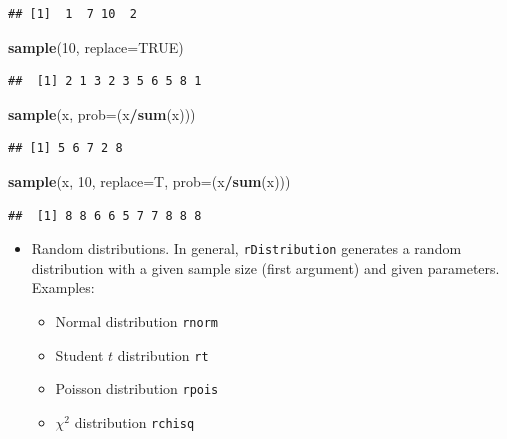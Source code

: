 \documentclass[
]{article}
\newenvironment{Shaded}{\begin{snugshade}}{\end{snugshade}}
\newcommand{\DataTypeTok}[1]{\textcolor[rgb]{0.13,0.29,0.53}{#1}}
\newcommand{\DecValTok}[1]{\textcolor[rgb]{0.00,0.00,0.81}{#1}}
\newcommand{\KeywordTok}[1]{\textcolor[rgb]{0.13,0.29,0.53}{\textbf{#1}}}
\newcommand{\NormalTok}[1]{#1}
\newcommand{\OperatorTok}[1]{\textcolor[rgb]{0.81,0.36,0.00}{\textbf{#1}}}
\newcommand{\OtherTok}[1]{\textcolor[rgb]{0.56,0.35,0.01}{#1}}
\providecommand{\tightlist}{%
  \setlength{\itemsep}{0pt}\setlength{\parskip}{0pt}}
\begin{document}
\begin{verbatim}
## [1]  1  7 10  2
\end{verbatim}

\begin{Shaded}
\begin{Highlighting}[]
\KeywordTok{sample}\NormalTok{(}\DecValTok{10}\NormalTok{, }\DataTypeTok{replace=}\OtherTok{TRUE}\NormalTok{)}
\end{Highlighting}
\end{Shaded}

\begin{verbatim}
##  [1] 2 1 3 2 3 5 6 5 8 1
\end{verbatim}

\begin{Shaded}
\begin{Highlighting}[]
\KeywordTok{sample}\NormalTok{(x, }\DataTypeTok{prob=}\NormalTok{(x}\OperatorTok{/}\KeywordTok{sum}\NormalTok{(x)))}
\end{Highlighting}
\end{Shaded}

\begin{verbatim}
## [1] 5 6 7 2 8
\end{verbatim}

\begin{Shaded}
\begin{Highlighting}[]
\KeywordTok{sample}\NormalTok{(x, }\DecValTok{10}\NormalTok{, }\DataTypeTok{replace=}\NormalTok{T, }\DataTypeTok{prob=}\NormalTok{(x}\OperatorTok{/}\KeywordTok{sum}\NormalTok{(x)))}
\end{Highlighting}
\end{Shaded}

\begin{verbatim}
##  [1] 8 8 6 6 5 7 7 8 8 8
\end{verbatim}

\begin{itemize}
\tightlist
\item
  Random distributions. In general, \texttt{rDistribution} generates a
  random distribution with a given sample size (first argument) and
  given parameters. Examples:

  \begin{itemize}
  \tightlist
  \item
    Normal distribution \texttt{rnorm}
  \item
    Student \(t\) distribution \texttt{rt}
  \item
    Poisson distribution \texttt{rpois}
  \item
    \(\chi ^2\) distribution \texttt{rchisq}
  \end{itemize}
\end{itemize}
\end{document}
